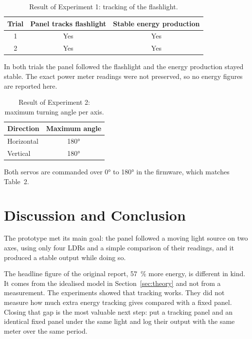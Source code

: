 \documentclass[11pt,a4paper]{article}
\begin{document}
\begin{table}[H]
  \centering
  \caption{Result of Experiment 1: tracking of the flashlight.}
  \begin{tabular}{@{}ccc@{}}
    \toprule
    Trial & Panel tracks flashlight & Stable energy production \\
    \midrule
    1 & Yes & Yes \\
    2 & Yes & Yes \\
    \bottomrule
  \end{tabular}
\end{table}

In both trials the panel followed the flashlight and the energy production stayed stable. The exact power meter readings were not preserved, so no energy figures are reported here.

\begin{table}[H]
  \centering
  \caption{Result of Experiment 2: maximum turning angle per axis.}
  \begin{tabular}{@{}lc@{}}
    \toprule
    Direction & Maximum angle \\
    \midrule
    Horizontal & \ang{180} \\
    Vertical   & \ang{180} \\
    \bottomrule
  \end{tabular}
\end{table}

Both servos are commanded over \ang{0} to \ang{180} in the firmware, which matches Table~2.

\section{Discussion and Conclusion}
\label{sec:discussion}

The prototype met its main goal: the panel followed a moving light source on two axes, using only four LDRs and a simple comparison of their readings, and it produced a stable output while doing so.

The headline figure of the original report, \SI{57}{\percent} more energy, is different in kind. It comes from the idealised model in Section~\ref{sec:theory} and not from a measurement. The experiments showed that tracking works. They did not measure how much extra energy tracking gives compared with a fixed panel. Closing that gap is the most valuable next step: put a tracking panel and an identical fixed panel under the same light and log their output with the same meter over the same period.
\end{document}
